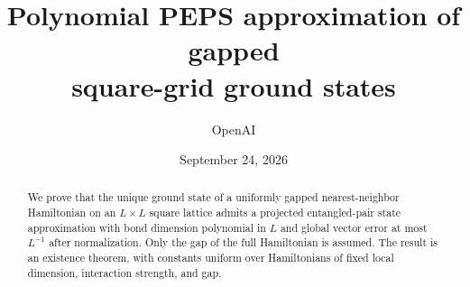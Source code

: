 \documentclass[11pt]{article}
\title{Polynomial PEPS approximation of gapped\texorpdfstring{\\}{ }square-grid ground states}
\author{OpenAI}
\date{September 24, 2026}
\numberwithin{equation}{section}
\theoremstyle{definition}
\theoremstyle{remark}
\begin{document}
\maketitle
\begin{abstract}
We prove that the unique ground state of a uniformly gapped nearest-neighbor
Hamiltonian on an $L\times L$ square lattice admits a projected entangled-pair
state approximation with bond dimension polynomial in $L$ and global vector
error at most $L^{-1}$ after normalization. Only the gap of the full Hamiltonian is assumed.
The result is an existence theorem, with constants uniform over
Hamiltonians of fixed local dimension, interaction strength, and gap.
\end{abstract}
\tableofcontents
\clearpage








\appendix

\begingroup
\small
\let\originalthebibliography\thebibliography
\renewcommand{\thebibliography}[1]{%
  \originalthebibliography{#1}%
  \addcontentsline{toc}{section}{\refname}%
}


\endgroup
\end{document}
